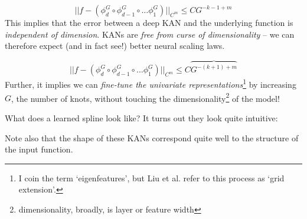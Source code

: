 \begin{frame}
    \[
        ||f - (\phi_{d}^G \circ \phi_{d-1}^G \circ \ldots \phi_1^G)||_{C^m} \leq CG^{-k-1+m}
    \]
    This implies that the error between a deep KAN and the underlying function is \emph{independent of dimension}. 
    KANs are \emph{free from curse of dimensionality} -- we can therefore expect (and in fact see!) better neural scaling laws. 
\end{frame}
\begin{frame}
    \[
        ||f - (\phi_{d}^G \circ \phi_{d-1}^G \circ \ldots \phi_1^G)||_{C^m} \leq C\overbrace{G^{-(k+1)+m}}
    \]
    Further, it implies we can \textit{fine-tune the univariate representations}\footnote{
    I coin the term `eigenfeatures', but Liu et al. refer to this process as `grid extension'.}
    by increasing $G$, the number of knots, without touching the dimensionality\footnote{dimensionality, broadly, is layer or feature width} of the model!
\end{frame}
\begin{frame}
    What does a learned spline look like? It turns out they look quite intuitive:
\end{frame}
\begin{frame}
    Note also that the shape of these KANs correspond quite well to the structure of the input function.
\end{frame}
